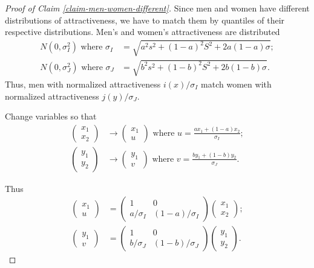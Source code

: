 \documentclass[
]{article}
\theoremstyle{definition}
\theoremstyle{definition}
\theoremstyle{definition}
\theoremstyle{definition}
\theoremstyle{remark}
\begin{document}
\begin{proof}[Proof of Claim \ref{claim-men-women-different}]

Since men and women have different distributions of attractiveness,
we have to match them by quantiles of their respective distributions. 
Men's and women's attractiveness are distributed
\begin{align*}
N(0,\sigma_{I}^{2})\textrm{ where }\sigma_{I} & =\sqrt{a^{2}s^{2}+(1-a)^{2}S^{2}+2a(1-a)\sigma};\\
N(0,\sigma_{J}^{2})\textrm{ where }\sigma_{J} & =\sqrt{b^{2}s^{2}+(1-b)^{2}S^{2}+2b(1-b)\sigma}.
\end{align*}
Thus, men with normalized attractiveness $i(x)/\sigma_{I}$ match
women with normalized attractiveness $j(y)/\sigma_{J}$.

Change variables so that 
\begin{align*}
\left(\begin{array}{c}
x_{1}\\
x_{2}
\end{array}\right) & \rightarrow\left(\begin{array}{c}
x_{1}\\
u
\end{array}\right)\textrm{ where }u=\frac{ax_{1}+(1-a)x_{2}}{\sigma_{I}};\\
\left(\begin{array}{c}
y_{1}\\
y_{2}
\end{array}\right) & \rightarrow\left(\begin{array}{c}
y_{1}\\
v
\end{array}\right)\textrm{ where }v=\frac{by_{1}+(1-b)y_{2}}{\sigma_{J}}.
\end{align*}

Thus 
\begin{align*}
\left(\begin{array}{c}
x_{1}\\
u
\end{array}\right) & =\left(\begin{array}{cc}
1 & 0\\
a/\sigma_{I} & (1-a)/\sigma_{I}
\end{array}\right)\left(\begin{array}{c}
x_{1}\\
x_{2}
\end{array}\right);\\
\left(\begin{array}{c}
y_{1}\\
v
\end{array}\right) & =\left(\begin{array}{cc}
1 & 0\\
b/\sigma_{J} & (1-b)/\sigma_{J}
\end{array}\right)\left(\begin{array}{c}
y_{1}\\
y_{2}
\end{array}\right).
\end{align*}


\end{proof}
\end{document}
